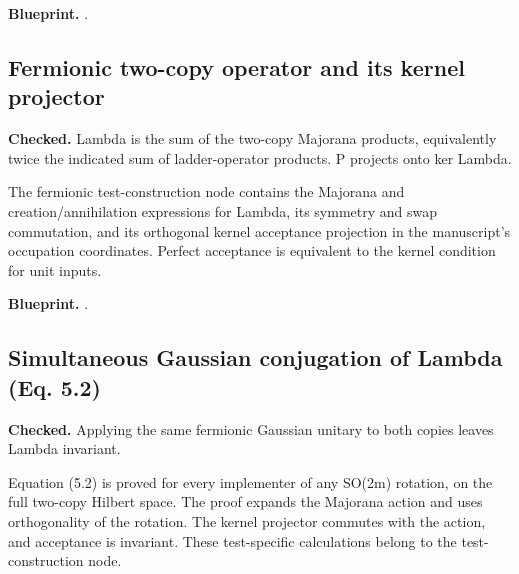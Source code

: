 \textbf{Blueprint.} .

\subsection{Fermionic two-copy operator and its kernel projector}\label{paper:lambda-f}
\textbf{Checked.} Lambda is the sum of the two-copy Majorana products, equivalently twice the indicated sum of ladder-operator products. P projects onto ker Lambda. 

The fermionic test-construction node contains the Majorana and creation/annihilation expressions for Lambda, its symmetry and swap commutation, and its orthogonal kernel acceptance projection in the manuscript's occupation coordinates. Perfect acceptance is equivalent to the kernel condition for unit inputs.


\textbf{Blueprint.} .

\subsection{Simultaneous Gaussian conjugation of Lambda (Eq. 5.2)}\label{paper:fermion-invariance}
\textbf{Checked.} Applying the same fermionic Gaussian unitary to both copies leaves Lambda invariant. 

Equation (5.2) is proved for every implementer of any SO(2m) rotation, on the full two-copy Hilbert space. The proof expands the Majorana action and uses orthogonality of the rotation. The kernel projector commutes with the action, and acceptance is invariant. These test-specific calculations belong to the test-construction node.


